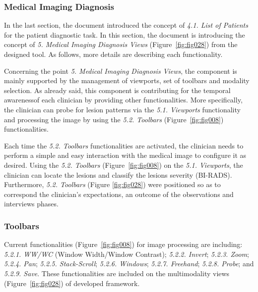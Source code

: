 \subsubsection{Medical Imaging Diagnosis}
\label{sec:sec004003001002}

In the last section, the document introduced the concept of {\it 4.1. List of Patients} for the patient diagnostic task.
In this section, the document is introducing the concept of {\it 5. Medical Imaging Diagnosis Views} (Figure~\ref{fig:fig028}) from the designed tool.
As follows, more details are describing each functionality.

Concerning the point {\it 5. Medical Imaging Diagnosis Views}, the component is mainly supported by the management of viewports, set of toolbars and modality selection.
As already said, this component is contributing for the temporal awareness\footnotemark[13] of each clinician by providing other functionalities.
More specifically, the clinician can probe for lesion patterns via the {\it 5.1. Viewports} functionality and processing the image by using the {\it 5.2. Toolbars} (Figure~\ref{fig:fig008}) functionalities.

Each time the {\it 5.2. Toolbars} functionalities are activated, the clinician needs to perform a simple and easy interaction with the medical image to configure it as desired.
Using the {\it 5.2. Toolbars} (Figure~\ref{fig:fig008}) on the {\it 5.1. Viewports}, the clinician can locate the lesions and classify the lesions severity (\ac{BI-RADS}).
Furthermore, {\it 5.2. Toolbars} (Figure \ref{fig:fig028}) were positioned so as to correspond the clinician's expectations, an outcome of the observations and interviews phases.


\subsubsection{Toolbars}
\label{sec:sec004003001003}

Current functionalities (Figure~\ref{fig:fig008}) for image processing are including:
{\it 5.2.1. WW/WC} (Window Width/Window Contrast);
{\it 5.2.2. Invert};
{\it 5.2.3. Zoom};
{\it 5.2.4. Pan};
{\it 5.2.5. Stack-Scroll};
{\it 5.2.6. Windows};
{\it 5.2.7. Freehand};
{\it 5.2.8. Probe}; and
{\it 5.2.9. Save}.
These functionalities are included on the multimodality views (Figure~\ref{fig:fig028}) of developed framework.

